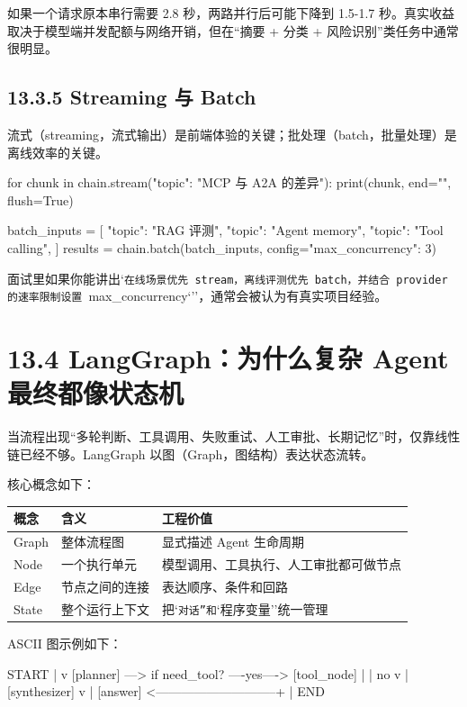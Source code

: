 如果一个请求原本串行需要 2.8 秒，两路并行后可能下降到 1.5-1.7 秒。真实收益取决于模型端并发配额与网络开销，但在``摘要 + 分类 + 风险识别''类任务中通常很明显。


\subsection{13.3.5 Streaming 与 Batch}

流式（streaming，流式输出）是前端体验的关键；批处理（batch，批量处理）是离线效率的关键。


\begin{codeblock}
for chunk in chain.stream({"topic": "MCP 与 A2A 的差异"}):
    print(chunk, end="", flush=True)

batch_inputs = [
    {"topic": "RAG 评测"},
    {"topic": "Agent memory"},
    {"topic": "Tool calling"},
]
results = chain.batch(batch_inputs, config={"max_concurrency": 3})
\end{codeblock}

面试里如果你能讲出`\texttt{在线场景优先 stream，离线评测优先 batch，并结合 provider 的速率限制设置 }max\_concurrency`''，通常会被认为有真实项目经验。


\section{13.4 LangGraph：为什么复杂 Agent 最终都像状态机}

当流程出现``多轮判断、工具调用、失败重试、人工审批、长期记忆''时，仅靠线性链已经不够。LangGraph 以图（Graph，图结构）表达状态流转。


核心概念如下：


\begingroup
\scriptsize
\setlength{\tabcolsep}{3pt}
\begin{longtable}{|p{}|p{}|p{}|}
\hline
概念 & 含义 & 工程价值 \\ \hline
Graph & 整体流程图 & 显式描述 Agent 生命周期 \\ \hline
Node & 一个执行单元 & 模型调用、工具执行、人工审批都可做节点 \\ \hline
Edge & 节点之间的连接 & 表达顺序、条件和回路 \\ \hline
State & 整个运行上下文 & 把`\texttt{对话''和}`程序变量''统一管理 \\ \hline
\end{longtable}
\endgroup

ASCII 图示例如下：


\begin{codeblock}
START
  |
  v
[planner] ---> if need_tool? ----yes----> [tool_node]
  |                                   |
  no                                  v
  |                               [synthesizer]
  v                                   |
[answer] <-----------------------------+
  |
 END
\end{codeblock}

